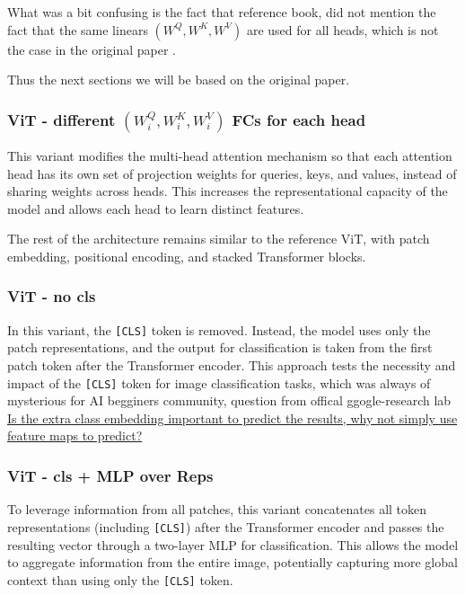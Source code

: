 What was a bit confusing is the fact that reference book, did not mention the fact that the same linears $(W^Q, W^K, W^V)$ are used for all heads, which is not the case in the original paper \cite{dosovitskiy2020image}.

Thus the next sections we will be based on the original paper.


\subsubsection{ViT - different $(W^Q_i, W^K_i, W^V_i)$ FCs for each head}
This variant modifies the multi-head attention mechanism so that each attention head has its own set of projection weights for queries, keys, and values, instead of sharing weights across heads. This increases the representational capacity of the model and allows each head to learn distinct features.

The rest of the architecture remains similar to the reference ViT, with patch embedding, positional encoding, and stacked Transformer blocks.

\subsubsection{ViT - no cls}
In this variant, the \texttt{[CLS]} token is removed. Instead, the model uses only the patch representations, and the output for classification is taken from the first patch token after the Transformer encoder. This approach tests the necessity and impact of the \texttt{[CLS]} token for image classification tasks, which was always of mysterious for AI begginers community, question from offical ggogle-research lab \href{https://github.com/google-research/vision_transformer/issues/61#issuecomment-802233921}{ Is the extra class embedding important to predict the results, why not simply use feature maps to predict?}

\subsubsection{ViT - cls + MLP over Reps}
To leverage information from all patches, this variant concatenates all token representations (including \texttt{[CLS]}) after the Transformer encoder and passes the resulting vector through a two-layer MLP for classification. This allows the model to aggregate information from the entire image, potentially capturing more global context than using only the \texttt{[CLS]} token.

